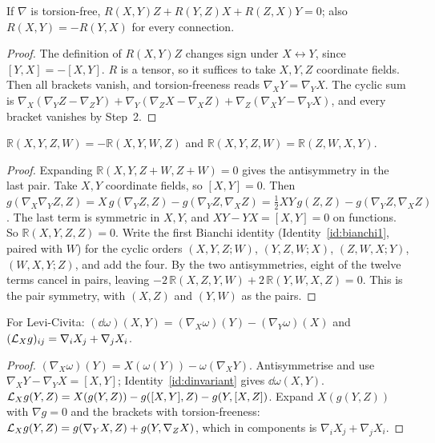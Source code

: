 \begin{identity}\label{id:bianchi1}
If $\nabla$ is torsion-free, $R(X,Y)Z+R(Y,Z)X+R(Z,X)Y=0$; also $R(X,Y)=-R(Y,X)$ for every connection.
\end{identity}
\begin{proof}
 The definition of $R(X,Y)Z$ changes sign under $X\leftrightarrow Y$, since $[Y,X]=-[X,Y]$.
 $R$ is a tensor, so it suffices to take $X,Y,Z$ coordinate fields. Then all brackets vanish, and torsion-freeness reads $\nabla_XY=\nabla_YX$.
 The cyclic sum is
$\nabla_X(\nabla_YZ-\nabla_ZY)+\nabla_Y(\nabla_ZX-\nabla_XZ)+\nabla_Z(\nabla_XY-\nabla_YX)$, and every bracket vanishes by Step~2.
\end{proof}

\begin{identity}\label{id:riemannsym}
$\mathbb R(X,Y,Z,W)=-\mathbb R(X,Y,W,Z)$ and $\mathbb R(X,Y,Z,W)=\mathbb R(Z,W,X,Y)$.
\end{identity}
\begin{proof}
 Expanding $\mathbb R(X,Y,Z+W,Z+W)=0$ gives the antisymmetry in the last pair.
 Take $X,Y$ coordinate fields, so $[X,Y]=0$. Then
$g(\nabla_X\nabla_YZ,Z)=X\,g(\nabla_YZ,Z)-g(\nabla_YZ,\nabla_XZ)=\tfrac12XY\,g(Z,Z)-g(\nabla_YZ,\nabla_XZ)$.
 The last term is symmetric in $X,Y$, and $XY-YX=[X,Y]=0$ on functions. So $\mathbb R(X,Y,Z,Z)=0$.
 Write the first Bianchi identity (Identity~\ref{id:bianchi1}, paired with $W$) for the cyclic orders
$(X,Y,Z;W)$, $(Y,Z,W;X)$, $(Z,W,X;Y)$, $(W,X,Y;Z)$, and add the four. By the two antisymmetries, eight of the twelve terms cancel in pairs, leaving
$-2\,\mathbb R(X,Z,Y,W)+2\,\mathbb R(Y,W,X,Z)=0$. This is the pair symmetry, with $(X,Z)$ and $(Y,W)$ as the pairs.
\end{proof}

\begin{identity}\label{id:threederivs}
For Levi-Civita: $(\dd\omega)(X,Y)=(\nabla_X\omega)(Y)-(\nabla_Y\omega)(X)$ and $(\mathcal{L}_Xg)_{ij}=\nabla_iX_j+\nabla_jX_i$.
\end{identity}
\begin{proof}
 $(\nabla_X\omega)(Y)=X(\omega(Y))-\omega(\nabla_XY)$. Antisymmetrise and use $\nabla_XY-\nabla_YX=[X,Y]$; Identity~\ref{id:dinvariant} gives $\dd\omega(X,Y)$.
 $\mathcal{L}_Xg(Y,Z)=X(g(Y,Z))-g([X,Y],Z)-g(Y,[X,Z])$. Expand $X(g(Y,Z))$ with $\nabla g=0$ and the brackets with torsion-freeness:
$\mathcal{L}_Xg(Y,Z)=g(\nabla_YX,Z)+g(Y,\nabla_ZX)$, which in components is $\nabla_iX_j+\nabla_jX_i$.
\end{proof}

